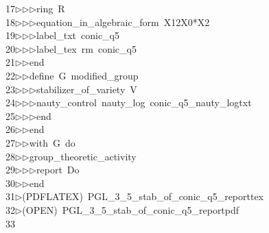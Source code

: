 \begin{tabbing}
17\>$\triangleright$\>$\triangleright$\>$\triangleright$\>ring\ R\ \\[0pt]
18\>$\triangleright$\>$\triangleright$\>$\triangleright$\>equation\_in\_algebraic\_form\ X12X0*X2\ \\[0pt]
19\>$\triangleright$\>$\triangleright$\>$\triangleright$\>label\_txt\ conic\_q5\ \\[0pt]
20\>$\triangleright$\>$\triangleright$\>$\triangleright$\>label\_tex\ rm\ conic\_q5\ \\[0pt]
21\>$\triangleright$\>$\triangleright$\>end\ \\[0pt]
22\>$\triangleright$\>$\triangleright$\>define\ G\ modified\_group\ \\[0pt]
23\>$\triangleright$\>$\triangleright$\>$\triangleright$\>stabilizer\_of\_variety\ V\ \\[0pt]
24\>$\triangleright$\>$\triangleright$\>$\triangleright$\>nauty\_control\ nauty\_log\ conic\_q5\_nauty\_logtxt\ \\[0pt]
25\>$\triangleright$\>$\triangleright$\>$\triangleright$\>end\ \\[0pt]
26\>$\triangleright$\>$\triangleright$\>end\ \\[0pt]
27\>$\triangleright$\>$\triangleright$\>with\ G\ do\ \\[0pt]
28\>$\triangleright$\>$\triangleright$\>group\_theoretic\_activity\ \\[0pt]
29\>$\triangleright$\>$\triangleright$\>$\triangleright$\>report\ Do\ \\[0pt]
30\>$\triangleright$\>$\triangleright$\>end\\[0pt]
31\>$\triangleright$\>(PDFLATEX)\ PGL\_3\_5\_stab\_of\_conic\_q5\_reporttex\\[0pt]
32\>$\triangleright$\>(OPEN)\ PGL\_3\_5\_stab\_of\_conic\_q5\_reportpdf\\[0pt]
33\>\end{tabbing}
